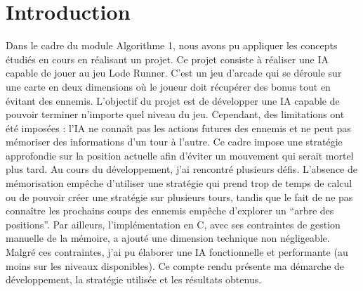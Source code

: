 \chapter{Introduction}
\label{cp:introduction}
Dans le cadre du module Algorithme 1, nous avons pu appliquer les concepts étudiés en cours en réalisant un projet. Ce projet consiste à réaliser une IA capable de jouer au jeu Lode Runner. C'est un jeu d'arcade qui se déroule sur une carte en deux dimensions où le joueur doit récupérer des bonus tout en évitant des ennemis. 
\newline\newline
L'objectif du projet est de développer une IA capable de pouvoir terminer n'importe quel niveau du jeu. Cependant, des limitations ont été imposées : l'IA ne connaît pas les actions futures des ennemis et ne peut pas mémoriser des informations d'un tour à l'autre. Ce cadre impose une stratégie approfondie sur la position actuelle afin d'éviter un mouvement qui serait mortel plus tard.
\newline\newline
Au cours du développement, j'ai rencontré plusieurs défis. L'absence de mémorisation empêche d'utiliser une stratégie qui prend trop de temps de calcul ou de pouvoir créer une stratégie sur plusieurs tours, tandis que le fait de ne pas connaître les prochains coups des ennemis empêche d'explorer un “arbre des positions”. Par ailleurs, l'implémentation en C, avec ses contraintes de gestion manuelle de la mémoire, a ajouté une dimension technique non négligeable.
\newline\newline
Malgré ces contraintes, j'ai pu élaborer une IA fonctionnelle et performante (au moins sur les niveaux disponibles).
\newline\newline
Ce compte rendu présente ma démarche de développement, la stratégie utilisée et les résultats obtenus.